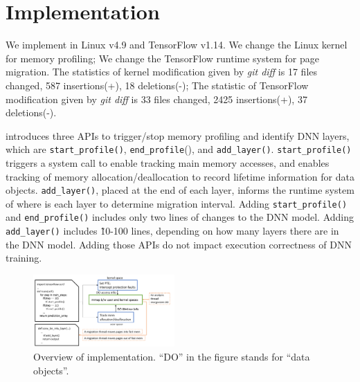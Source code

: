 \section{Implementation}
\label{sec:impl}

We implement \name in Linux v4.9 and TensorFlow v1.14. We change the Linux kernel for memory profiling; We change the TensorFlow runtime system for page migration. The statistics of kernel modification given by \textit{git diff} is 17 files changed, 587 insertions(+), 18 deletions(-); The statistic of TensorFlow modification given by \textit{git diff} is 33 files changed, 2425 insertions(+), 37 deletions(-).

\name introduces three APIs to trigger/stop memory profiling and identify DNN layers, which are \texttt{start\_profile()}, \texttt{end\_profile}(), and \texttt{add\_layer()}. \texttt{start\_profile()} triggers a system call to enable tracking main memory accesses, and enables tracking of memory allocation/deallocation to record lifetime information for data objects. \texttt{add\_layer()}, placed at the end of each layer, informs the runtime system of where is each layer to determine migration interval. Adding \texttt{start\_profile()} and \texttt{end\_profile()} includes only two lines of changes to the DNN model. Adding \texttt{add\_layer()} includes \~10-100 lines, depending on how many layers there are in the DNN model. Adding those APIs do not impact execution correctness of DNN training. 




\begin{figure}
\centering
\includegraphics[width=0.48\textwidth]{figures/impl.pdf}
\vspace{-20pt}
\caption{Overview of \name implementation. ``DO'' in the figure stands for ``data objects''.}
\vspace{-15pt}
\label{fig:impl}
\end{figure}

